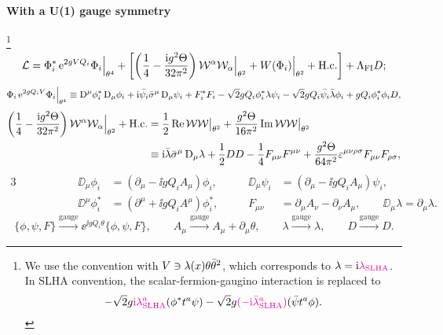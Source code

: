 \documentclass[CheatSheet]{subfiles}
\begin{document}
\paragraph{With a U(1) gauge symmetry}
\footnote{
  We use the convention with $V\ni\lambda(x)\theta\bar\theta^2$, which corresponds to $\lambda=\mathrm{i}{\color{magenta}\lambda_{\text{SLHA}}}$. In SLHA convention, the scalar-fermion-gaugino interaction is replaced to 
\begin{equation*}
  -\sqrt{2}g{{\color{magenta}\mathrm{i}\lambda^a_{\text{SLHA}}}} (\phi^*t^a\psi)
 -\sqrt{2}g{{\color{magenta}(-\mathrm{i}\bar\lambda^a_{\text{SLHA}})}}(\bar\psi t^a\phi).
\end{equation*}
}%
\begin{equation}
   \mathcal L =
\Phi^*_i \mathop{}\!\mathrm{e}^{2gV Q_i}\Phi_i\Big|_{\theta^4}
+
\biggl[
\left(\frac14 - \frac{\mathrm{i} g^2\Theta}{32\pi^2}\right)
\mathcal W^\alpha\mathcal W_\alpha\Big|_{\theta^2} +
W(\Phi_i)\Big|_{\theta^2} + \text{H.c.}
\biggr]
+
\Lambda_{\text{FI}}D;
\end{equation}\vskip-18pt
\begin{equation}
\Phi_i \mathop{}\!\mathrm{e}^{2gQ_i V} \Phi_i\Big|_{\theta^4}
\equiv
\mathop{}\!\mathrm{D}^{\mu}\phi_i^*\mathop{}\!\mathrm{D}_{\mu}\phi_i
+\mathrm{i} \bar{\psi_i}\bar\sigma^{\mu}\mathop{}\!\mathrm{D}_{\mu}\psi_i
+F_i^*F_i
-\sqrt{2} g Q_i \phi_i^*\lambda\psi_i
-\sqrt{2} g Q_i \bar{\psi_i}\bar{\lambda}\phi_i
+g Q_i \phi_i^*\phi_i D,
\end{equation}\vskip-18pt
\begin{equation}
\begin{split}
 \left(\frac14 - \frac{\mathrm{i} g^2\Theta}{32\pi^2}\right)
 \mathcal W^\alpha\mathcal W_\alpha\Big|_{\theta^2}+\text{H.c.}
 &= \frac{1}{2}\mathop{\mathrm{Re}}\mathcal W\mathcal W\big|_{\theta^2}
 + \frac{g^2\Theta}{16\pi^2}\mathop{\mathrm{Im}}\mathcal W\mathcal W\big|_{\theta^2}
 \\
 &\equiv \mathrm{i}\bar{\lambda}\bar\sigma^{\mu}\mathop{}\!\mathrm{D}_{\mu}\lambda
 +\frac12DD
 -\frac14F_{\mu\nu}F^{\mu\nu}
 +\frac{g^2\Theta}{64\pi^2}\varepsilon^{\mu \nu\rho\sigma}
 F_{\mu\nu}F_{\rho\sigma},
\end{split}
\end{equation}\vskip-18pt
\begin{alignat*}{3}
\qquad\qquad&&
 \DD_{\mu}\phi_i&=(\partial_\mu-\ii g Q_i A_\mu)\phi_i, \qquad&
 \DD_{\mu}\psi_i&=(\partial_\mu-\ii g Q_i A_\mu)\psi_i, \\&&
\DD^{\mu}\phi_i^*&=(\partial^\mu+\ii g Q_i A^\mu)\phi_i^*, &
 F_{\mu\nu} &= \partial_\mu A_\nu-\partial_\nu A_\mu,\qquad
\DD_\mu\lambda=\partial_\mu\lambda.
\end{alignat*}\vskip-18pt
\begin{equation}
  \{\phi,\psi,F\}\xrightarrow{\text{gauge}}
 \ee^{\ii g Q_i \theta}\{\phi,\psi,F\},\qquad
  A_\mu\xrightarrow{\text{gauge}} A_\mu+\partial_\mu \theta,\qquad
  \lambda\xrightarrow{\text{gauge}}\lambda,\qquad
  D\xrightarrow{\text{gauge}}D.
\end{equation}
\end{document}

